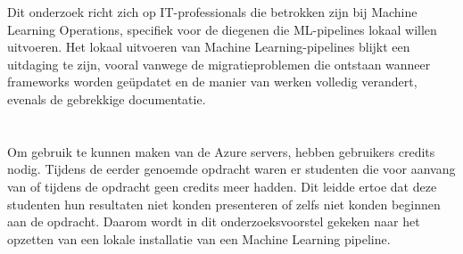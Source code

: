 Dit onderzoek richt zich op IT-professionals die betrokken zijn bij Machine Learning Operations, specifiek voor de diegenen die ML-pipelines lokaal willen uitvoeren.
Het lokaal uitvoeren van Machine Learning-pipelines blijkt een uitdaging te zijn, vooral vanwege de migratieproblemen die ontstaan wanneer frameworks worden geüpdatet en de manier van werken volledig verandert, evenals de gebrekkige documentatie.



\section{}%
\label{sec:probleemstelling}

Om gebruik te kunnen maken van de Azure servers, hebben gebruikers credits nodig. Tijdens de eerder genoemde opdracht waren er studenten die voor aanvang van of tijdens de opdracht geen credits meer hadden. Dit leidde ertoe dat deze studenten hun resultaten niet konden presenteren of zelfs niet konden beginnen aan de opdracht. Daarom wordt in dit onderzoeksvoorstel gekeken naar het opzetten van een lokale installatie van een Machine Learning pipeline.

\section{}%
\label{sec:onderzoeksvraag}

